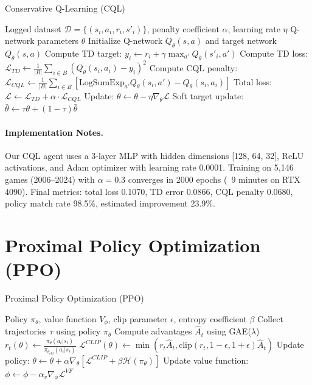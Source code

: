 \documentclass[12pt]{report}  %
\numberwithin{equation}{section}
\theoremstyle{plain}
\theoremstyle{definition}
\theoremstyle{remark}
\begin{document}
\begin{algorithm}[H]
\caption{Conservative Q-Learning (CQL)}
\begin{algorithmic}[1]
\Require Logged dataset $\mathcal{D} = \{(s_i, a_i, r_i, s'_i)\}$, penalty coefficient $\alpha$, learning rate $\eta$
\Ensure Q-network parameters $\theta$
\State Initialize Q-network $Q_\theta(s,a)$ and target network $Q_{\bar\theta}(s,a)$
    \State Compute TD target: $y_i \gets r_i + \gamma \max_{a'} Q_{\bar\theta}(s'_i, a')$
    \State Compute TD loss: $\mathcal{L}_{TD} \gets \frac{1}{|B|} \sum_{i \in B} (Q_\theta(s_i, a_i) - y_i)^2$
    \State Compute CQL penalty: $\mathcal{L}_{CQL} \gets \frac{1}{|B|} \sum_{i \in B} \left[\text{LogSumExp}_{a'} Q_\theta(s_i, a') - Q_\theta(s_i, a_i)\right]$
    \State Total loss: $\mathcal{L} \gets \mathcal{L}_{TD} + \alpha \cdot \mathcal{L}_{CQL}$
    \State Update: $\theta \gets \theta - \eta \nabla_\theta \mathcal{L}$
  \EndFor
  \State Soft target update: $\bar\theta \gets \tau \theta + (1 - \tau) \bar\theta$
\EndFor
\end{algorithmic}
\end{algorithm}

\paragraph{Implementation Notes.}
Our CQL agent uses a 3-layer MLP with hidden dimensions [128, 64, 32], ReLU activations, and Adam optimizer with learning rate 0.0001. Training on 5,146 games (2006--2024) with $\alpha=0.3$ converges in 2000 epochs (~9 minutes on RTX 4090). Final metrics: total loss 0.1070, TD error 0.0866, CQL penalty 0.0680, policy match rate 98.5\%, estimated improvement 23.9\%.

\section{Proximal Policy Optimization (PPO)}
\begin{algorithm}[H]
\caption{Proximal Policy Optimization (PPO)}
\begin{algorithmic}[1]
\Require Policy $\pi_\theta$, value function $V_\phi$, clip parameter $\epsilon$, entropy coefficient $\beta$
  \State Collect trajectories $\tau$ using policy $\pi_\theta$
  \State Compute advantages $\hat{A}_t$ using GAE($\lambda$)
      \State $r_t(\theta) \gets \frac{\pi_\theta(a_t|s_t)}{\pi_{\theta_{old}}(a_t|s_t)}$
      \State $\mathcal{L}^{CLIP}(\theta) \gets \min(r_t \hat{A}_t, \text{clip}(r_t, 1-\epsilon, 1+\epsilon) \hat{A}_t)$
      \State Update policy: $\theta \gets \theta + \alpha \nabla_\theta [\mathcal{L}^{CLIP} + \beta \mathcal{H}(\pi_\theta)]$
    \EndFor
  \EndFor
  \State Update value function: $\phi \gets \phi - \alpha_v \nabla_\phi \mathcal{L}^{VF}$
\EndFor
\end{algorithmic}
\end{algorithm}
\end{document}
